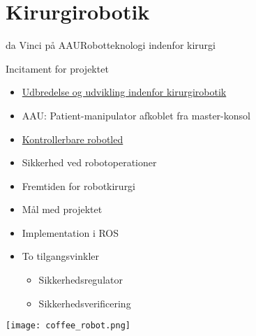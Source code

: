 \section{Kirurgirobotik}
\begin{frame}{da Vinci på AAU}{Robotteknologi indenfor kirurgi}
\vspace{8mm}
\begin{block}{Incitament for projektet}
	\begin{itemize}
		\item \href{file:video/surgery_robotics_history_davinci_chart.mp4}{Udbredelse og udvikling indenfor kirurgirobotik}
		\item AAU: Patient-manipulator afkoblet fra master-konsol 
		\item \href{file:video/davinci_joints.mp4}{Kontrollerbare robotled}
		\item Sikkerhed ved robotoperationer
		\item Fremtiden for robotkirurgi
		\item Mål med projektet
		\item Implementation i ROS
		\item To tilgangsvinkler
		\begin{itemize}
			\item Sikkerhedsregulator
			\item Sikkerhedsverificering
		\end{itemize}
	\end{itemize}
\end{block}
\begin{flushright}
	\vspace{-37mm}
\texttt{[image: coffee\_robot.png]}
\end{flushright}
\vspace{1cm}
\end{frame}

